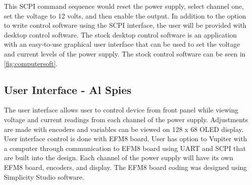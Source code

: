 \documentclass[15pt]{article}
\begin{document}
This SCPI command sequence would reset the power supply, select channel one, set the voltage to 12 volts, and then enable the output. In addition to the option to write control software using the SCPI interface, the user will be provided with desktop control software. The stock desktop control software is an application with an easy-to-use graphical user interface that can be used to set the voltage and current levels of the power supply. The stock control software can be seen in \autoref{fig:computersoft}.

\subsection{User Interface - Al Spies}
The user interface allows user to control device from front panel while viewing voltage and current readings from each channel of the power supply. Adjustments are made with encoders and variables can be viewed on 128 x 68 OLED display. User interface control is done with EFM8 board. User has option to Vupiter with a computer through communication to EFM8 board using UART and SCPI that are built into the design. Each channel of the power supply will have its own EFM8 board, encoders, and display. The EFM8 board coding was designed using Simplicity Studio software.
\end{document}

